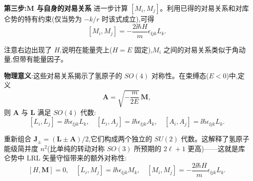 \begin{question}
\begin{solution}
	\textbf{第三步:$\mathbf M$ 与自身的对易关系} 进一步计算 $[M_i,M_j]$。利用已得的对易关系和对库仑势的特有约束(仅当势为 $-k/r$ 时该式成立),可得
	\[
	[M_i,M_j] = -\frac{2\ii\hbar H}{m}\epsilon_{\ii jk}L_k.
	\]

	注意右边出现了 $H$,说明在能量壳上($H=E$ 固定),$M_i$ 之间的对易关系类似于角动量,但带有能量因子。

	\textbf{物理意义}:这些对易关系揭示了氢原子的 $SO(4)$ 对称性。在束缚态($E<0$)中,定义
	\[
	\mathbf A = \sqrt{-\frac{m}{2E}}\,\mathbf M,
	\]
	则 $\mathbf A$ 与 $\mathbf L$ 满足 $SO(4)$ 代数:
	\[
	[L_i,L_j]=\ii\hbar\epsilon_{\ii jk}L_k,\quad
	[L_i,A_j]=\ii\hbar\epsilon_{\ii jk}A_k,\quad
	[A_i,A_j]=\ii\hbar\epsilon_{\ii jk}L_k.
	\]

	重新组合 $\mathbf J_\pm = (\mathbf L\pm\mathbf A)/2$,它们构成两个独立的 $SU(2)$ 代数。这解释了氢原子能级简并度 $n^2$(比单纯的转动对称 $SO(3)$ 所预期的 $2\ell+1$ 更高)——这就是库仑势中 LRL 矢量守恒带来的额外对称性:
	\[
	\boxed{[H,\mathbf M]=0,\quad [L_i,M_j]=\ii\hbar\epsilon_{\ii jk}M_k,\quad
	[M_i,M_j]=-\frac{2\ii\hbar H}{m}\epsilon_{\ii jk}L_k}.
	\]
	\end{solution}
\end{question}

